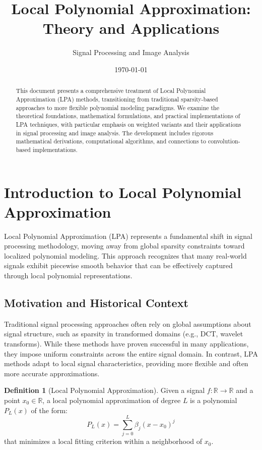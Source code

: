 \documentclass[12pt]{article}
\title{Local Polynomial Approximation: Theory and Applications}
\author{Signal Processing and Image Analysis}
\date{\today}
\newcommand{\R}{\mathbb{R}}
\theoremstyle{definition}
\newtheorem{definition}[theorem]{Definition}
\begin{document}
\maketitle

\begin{abstract}
    This document presents a comprehensive treatment of Local Polynomial Approximation (LPA) methods, transitioning from traditional sparsity-based approaches to more flexible polynomial modeling paradigms. We examine the theoretical foundations, mathematical formulations, and practical implementations of LPA techniques, with particular emphasis on weighted variants and their applications in signal processing and image analysis. The development includes rigorous mathematical derivations, computational algorithms, and connections to convolution-based implementations.
\end{abstract}

\tableofcontents

\newpage

\section{Introduction to Local Polynomial Approximation}
\label{sec:intro}

Local Polynomial Approximation (LPA) represents a fundamental shift in signal processing methodology, moving away from global sparsity constraints toward localized polynomial modeling. This approach recognizes that many real-world signals exhibit piecewise smooth behavior that can be effectively captured through local polynomial representations.

\subsection{Motivation and Historical Context}
\label{subsec:motivation}

Traditional signal processing approaches often rely on global assumptions about signal structure, such as sparsity in transformed domains (e.g., DCT, wavelet transforms). While these methods have proven successful in many applications, they impose uniform constraints across the entire signal domain. In contrast, LPA methods adapt to local signal characteristics, providing more flexible and often more accurate approximations.

\begin{definition}[Local Polynomial Approximation]
    \label{def:lpa}
    Given a signal $f: \R \to \R$ and a point $x_0 \in \R$, a local polynomial approximation of degree $L$ is a polynomial $P_L(x)$ of the form:
    \begin{equation}
        P_L(x) = \sum_{j=0}^{L} \beta_j (x - x_0)^j
    \end{equation}
    that minimizes a local fitting criterion within a neighborhood of $x_0$.
\end{definition}
\end{document}
